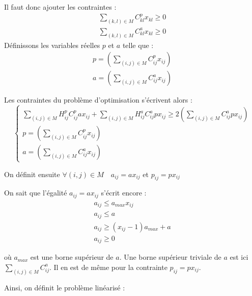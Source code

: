 \documentclass[a4paper,11pt] {article}
\begin{document}
Il faut donc ajouter les contraintes : 
\begin{equation}
\begin{array}{l}
\sum\limits_{(k,l)\in M} C^p_{kl}x_{kl}\geq 0\\
\sum\limits_{(k,l)\in M} C^a_{kl}x_{kl}\geq 0
\end{array}
\end{equation}
Définissons les variables réelles $p$ et $a$ telle que  : 
\begin{equation}
\begin{array}{l}
p = (\sum\limits_{(i,j)\in M} C^p_{ij}x_{ij})\\
a = (\sum\limits_{(i,j)\in M} C^a_{ij}x_{ij})
\end{array}
\end{equation}

Les contraintes du problème d'optimisation s'écrivent alors : 
\begin{equation}
\left\{
\begin{array}{l}
\sum\limits_{(i,j)\in M} H^p_{ij}C^p_{ij}ax_{ij} + \sum\limits_{(i,j)\in M} H^a_{ij}C^a_{ij}px_{ij} \geq 2(\sum\limits_{(i,j)\in M} C^a_{ij}px_{ij})\\
p = (\sum\limits_{(i,j)\in M} C^p_{ij}x_{ij})\\
a = (\sum\limits_{(i,j)\in M} C^a_{ij}x_{ij})
\end{array}
\right.
\end{equation}

On définit ensuite $\forall (i,j)\in M\quad a_{ij}=ax_{ij}$ et $p_{ij}=px_{ij}$



On sait que l’égalité $a_{ij}=ax_{ij}$ s’écrit encore : 
\begin{equation}
\begin{array}{l}
a_{ij}\leq a_{max}x_{ij}\\
a_{ij}\leq a\\
a_{ij}\geq (x_{ij}-1)a_{max}+a\\
a_{ij} \geq 0
\end{array}
\end{equation}

où $a_{max}$ est une borne supérieur de $a$. Une borne supérieur triviale de $a$ est ici $\sum\limits_{(i,j)\in M} C^a_{ij}$. Il en est de même pour la contrainte $p_{ij}=px_{ij}$.

Ainsi, on définit le problème linéarisé : 
\end{document}
